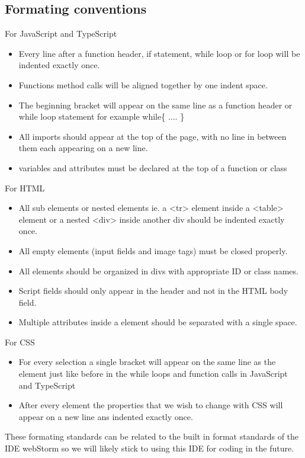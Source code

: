 \documentclass[a4paper]{article}
\begin{document}
\subsection{Formating conventions}
For JavaScript and TypeScript
\begin{itemize}
\item Every line after a function header, if statement, while loop or for loop will be indented exactly once.
\item Functions method calls will be aligned together by one indent space.
\item The beginning bracket will appear on the same line as a function header or while loop statement for example while{\{}
\newline.... {\}}
\item All imports should appear at the top of the page, with no line in between them each appearing on a new line.
\item variables and attributes must be declared at the top of a function or class
\end{itemize}
For HTML
\begin{itemize}
\item All sub elements or nested elements ie. a <tr> element inside a <table> element or a nested <div> inside another div should be indented exactly once. 
\item All empty elements (input fields and image tags) must be closed properly. 
\item All elements should be organized in divs with appropriate ID or class names. 
\item Script fields should only appear in the header and not in the HTML body field.
\item Multiple attributes inside a element should be separated with a single space. 
\end{itemize}
For CSS
\begin{itemize}
\item For every selection a single bracket will appear on the same line as the element just like before in the while loops and function calls in JavaScript and TypeScript
\item After every element the properties that we wish to change with CSS will appear on a new line ans indented exactly once.  
\end{itemize}
These formating standards can be related to the built in format standards of the IDE webStorm so we will likely stick to using this IDE for coding in the future. 
\end{document}
